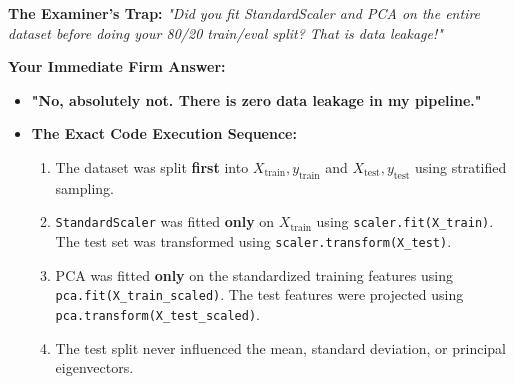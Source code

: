 \documentclass[a4paper, 11pt]{article}
\begin{document}
\begin{trapbox}
\textbf{The Examiner's Trap:} \textit{"Did you fit StandardScaler and PCA on the entire dataset before doing your 80/20 train/eval split? That is data leakage!"}

\textbf{Your Immediate Firm Answer:}
\begin{itemize}
    \item \textbf{"No, absolutely not. There is zero data leakage in my pipeline."}
    \item \textbf{The Exact Code Execution Sequence:}
    \begin{enumerate}
        \item The dataset was split \textbf{first} into $X_{\text{train}}, y_{\text{train}}$ and $X_{\text{test}}, y_{\text{test}}$ using stratified sampling.
        \item \texttt{StandardScaler} was fitted \textbf{only} on $X_{\text{train}}$ using \texttt{scaler.fit(X\_train)}. The test set was transformed using \texttt{scaler.transform(X\_test)}.
        \item PCA was fitted \textbf{only} on the standardized training features using \texttt{pca.fit(X\_train\_scaled)}. The test features were projected using \texttt{pca.transform(X\_test\_scaled)}.
        \item The test split never influenced the mean, standard deviation, or principal eigenvectors.
    \end{enumerate}
\end{itemize}
\end{trapbox}
\end{document}
